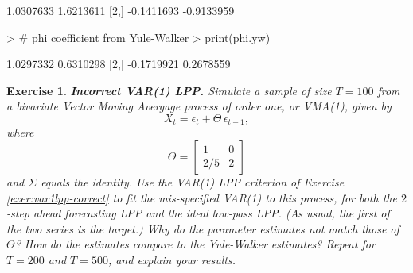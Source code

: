 \documentclass[a4paper]{book}
\newtheorem{Exercise}{Exercise}
\begin{document}
\begin{Schunk}
\begin{Soutput}
           [,1]       [,2]
[1,]  1.0307633  1.6213611
[2,] -0.1411693 -0.9133959
\end{Soutput}
\begin{Sinput}
> # phi coefficient from Yule-Walker
> print(phi.yw)
\end{Sinput}
\begin{Soutput}
           [,1]      [,2]
[1,]  1.0297332 0.6310298
[2,] -0.1719921 0.2678559
\end{Soutput}
\end{Schunk}

\begin{Exercise} {\bf Incorrect VAR(1) LPP.} \rm
\label{exer:var1lpp-incorrect}
 Simulate a sample of size $T=100$ from
 a bivariate Vector Moving Avergage process of order one, or VMA(1), given by
\[
  X_t = \epsilon_t + \Theta \, \epsilon_{t-1},
\]
  where
\[
 \Theta = \left[ \begin{array}{cc} 1 & 0 \\ 2/5 & 2 \end{array} \right]
\]
  and $\Sigma$ equals the identity.  Use the VAR(1) LPP criterion of 
 Exercise \ref{exer:var1lpp-correct} to 
 fit the mis-specified VAR(1) to this process, for both the $2$-step ahead forecasting
 LPP and the ideal low-pass LPP. 
(As usual, the first of the two series is the target.)
 Why do the parameter estimates not match those
 of $\Theta$?   How do the estimates compare to the Yule-Walker estimates?
 Repeat for $T=200$ and $T=500$, and explain your results.
\end{Exercise}
\end{document}
